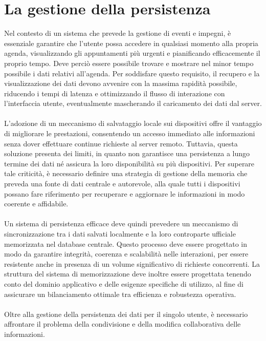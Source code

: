 \chapter{La gestione della persistenza}

Nel contesto di un sistema che prevede la gestione di eventi e impegni, 
è essenziale garantire che l’utente possa accedere in qualsiasi momento alla propria agenda, 
visualizzando gli appuntamenti più urgenti e pianificando efficacemente il proprio tempo. 
Deve perciò essere possibile trovare e mostrare nel minor tempo possibile i dati relativi all’agenda. 
Per soddisfare questo requisito, il recupero e la visualizzazione dei dati devono avvenire con la massima rapidità possibile, 
riducendo i tempi di latenza e ottimizzando il flusso di interazione con l’interfaccia utente, 
eventualmente mascherando il caricamento dei dati dal server.\\
\\
L’adozione di un meccanismo di salvataggio locale sui dispositivi offre il vantaggio di migliorare le prestazioni, 
consentendo un accesso immediato alle informazioni senza dover effettuare continue richieste al server remoto. 
Tuttavia, questa soluzione presenta dei limiti, in quanto non garantisce una persistenza a lungo termine dei dati 
né assicura la loro disponibilità su più dispositivi. 
Per superare tale criticità, è necessario definire una strategia di gestione della memoria che preveda una fonte di dati centrale e autorevole, 
alla quale tutti i dispositivi possano fare riferimento per recuperare e aggiornare le informazioni in modo coerente e affidabile.\\
\\
Un sistema di persistenza efficace deve quindi prevedere un meccanismo di sincronizzazione tra i dati salvati localmente e la loro controparte ufficiale memorizzata nel database centrale. 
Questo processo deve essere progettato in modo da garantire integrità, coerenza e scalabilità nelle interazioni, 
per essere resistente anche in presenza di un volume significativo di richieste concorrenti. 
La struttura del sistema di memorizzazione deve inoltre essere progettata tenendo conto del dominio applicativo e delle esigenze specifiche di utilizzo, 
al fine di assicurare un bilanciamento ottimale tra efficienza e robustezza operativa.\\
\\
Oltre alla gestione della persistenza dei dati per il singolo utente, è necessario affrontare il problema della condivisione e della modifica collaborativa delle informazioni. 
